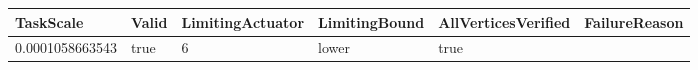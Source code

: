 \begin{tabular}{@{}llllll@{}}
\toprule
TaskScale & Valid & LimitingActuator & LimitingBound & AllVerticesVerified & FailureReason \\
\midrule
0.0001058663543 & true & 6 & lower & true &  \\
\bottomrule
\end{tabular}
